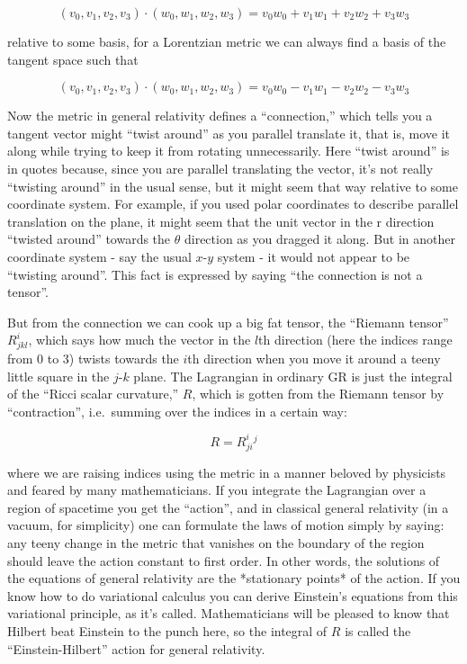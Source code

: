 \documentclass{article}
\begin{document}
\[(v_0,v_1,v_2,v_3)\cdot(w_0,w_1,w_2,w_3) = v_0w_0 + v_1w_1 + v_2w_2 + v_3w_3\]

relative to some basis, for a Lorentzian metric we can always find a
basis of the tangent space such that

\[(v_0,v_1,v_2,v_3)\cdot(w_0,w_1,w_2,w_3) = v_0w_0 - v_1w_1 - v_2w_2 - v_3w_3\]

Now the metric in general relativity defines a ``connection,'' which
tells you a tangent vector might ``twist around'' as you parallel
translate it, that is, move it along while trying to keep it from
rotating unnecessarily. Here ``twist around'' is in quotes because,
since you are parallel translating the vector, it's not really
``twisting around'' in the usual sense, but it might seem that way
relative to some coordinate system. For example, if you used polar
coordinates to describe parallel translation on the plane, it might seem
that the unit vector in the r direction ``twisted around'' towards the
\(\theta\) direction as you dragged it along. But in another coordinate
system - say the usual \(x\)-\(y\) system - it would not appear to be
``twisting around''. This fact is expressed by saying ``the connection
is not a tensor''.

But from the connection we can cook up a big fat tensor, the ``Riemann
tensor'' \(R^i_{jkl}\), which says how much the vector in the \(l\)th
direction (here the indices range from 0 to 3) twists towards the
\(i\)th direction when you move it around a teeny little square in the
\(j\)-\(k\) plane. The Lagrangian in ordinary GR is just the integral of
the ``Ricci scalar curvature,'' \(R\), which is gotten from the Riemann
tensor by ``contraction'', i.e.~summing over the indices in a certain
way:

\[R = R^i_{ji}{}^j\]

where we are raising indices using the metric in a manner beloved by
physicists and feared by many mathematicians. If you integrate the
Lagrangian over a region of spacetime you get the ``action'', and in
classical general relativity (in a vacuum, for simplicity) one can
formulate the laws of motion simply by saying: any teeny change in the
metric that vanishes on the boundary of the region should leave the
action constant to first order. In other words, the solutions of the
equations of general relativity are the *stationary points* of the
action. If you know how to do variational calculus you can derive
Einstein's equations from this variational principle, as it's called.
Mathematicians will be pleased to know that Hilbert beat Einstein to the
punch here, so the integral of \(R\) is called the ``Einstein-Hilbert''
action for general relativity.
\end{document}
